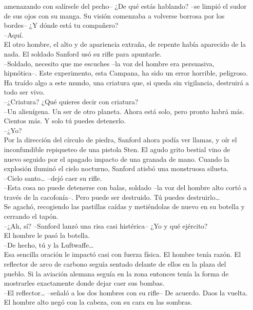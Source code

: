 amenazando con salírsele del pecho-- ¿De qué estás hablando? --se limpió
el sudor de sus ojos con su manga. Su visión comenzaba a volverse
borrosa por los bordes-- ¿Y dónde está tu compañero?\\
--Aquí.\\
El otro hombre, el alto y de apariencia extraña, de repente había
aparecido de la nada. El soldado Sanford usó su rifle para apuntarle.\\
--Soldado, necesito que me escuches --la voz del hombre era persuasiva,
hipnótica--. Este experimento, esta Campana, ha sido un error horrible,
peligroso. Ha traído algo a este mundo, una criatura que, si queda sin
vigilancia, destruirá a todo ser vivo.\\
--¿Criatura? ¿Qué quieres decir con criatura?\\
--Un alienígena. Un ser de otro planeta. Ahora está solo, pero pronto
habrá más. Cientos más. Y solo tú puedes detenerlo.\\
--¿Yo?\\
Por la dirección del círculo de piedra, Sanford ahora podía ver llamas,
y oír el inconfundible repiqueteo de una pistola Sten. El agudo grito
bestial vino de nuevo seguido por el apagado impacto de una granada de
mano. Cuando la explosión iluminó el cielo nocturno, Sanford atisbó una
monstruosa silueta.\\
--Cielo santo\ldots{} --dejó caer su rifle.\\
--Esta cosa no puede detenerse con balas, soldado --la voz del hombre
alto cortó a través de la cacofonía--. Pero puede ser destruido. Tú
puedes destruirlo\ldots{}\\
Se agachó, recogiendo las pastillas caídas y metiéndolas de nuevo en su
botella y cerrando el tapón.\\
--¿Ah, sí? --Sanford lanzó una risa casi histérica-- ¿Yo y qué
ejército?\\
El hombre le pasó la botella.\\
--De hecho, tú y la Luftwaffe\ldots{}\\
Esa sencilla oración le impactó casi con fuerza física. El hombre tenía
razón. El reflector de arco de carbono seguía sentado delante de ellos
en la plaza del pueblo. Si la aviación alemana seguía en la zona
entonces tenía la forma de mostrarles exactamente donde dejar caer sus
bombas.\\
--El reflector\ldots{} --señaló a los dos hombres con su rifle-- De
acuerdo. Daos la vuelta.\\
El hombre alto negó con la cabeza, con su cara en las sombras.\\
